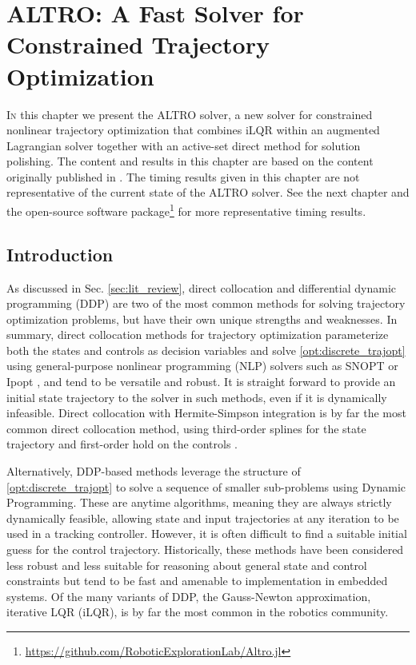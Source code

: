 \documentclass[../root.tex]{subfiles}
\begin{document}
\chapter[ALTRO]{ALTRO: A Fast Solver for Constrained Trajectory Optimization} \label{chap:altro}

\lettrine{I}{n} this chapter we present the ALTRO solver, a new solver for constrained 
nonlinear trajectory optimization that combines iLQR within an augmented 
Lagrangian solver together with an active-set direct method for solution 
polishing. The content and results in this chapter are based on the content
originally published in \cite{howell_ALTRO_2019}. The timing results given 
in this chapter are not representative of the current state of the ALTRO solver.
See the next chapter and the open-source software 
package\footnote{\url{https://github.com/RoboticExplorationLab/Altro.jl}} 
for more representative timing results.

\section{Introduction}

As discussed in Sec. \ref{sec:lit_review}, direct collocation and
differential dynamic programming (DDP) are two of the most common methods for
solving trajectory optimization problems, but have their own unique strengths
and weaknesses. In summary, direct collocation methods for trajectory
optimization parameterize both the states and controls as decision variables
and solve \eqref{opt:discrete_trajopt} using general-purpose nonlinear
programming (NLP) solvers such as SNOPT \cite{gill_SNOPT_2005} or Ipopt
\cite{wachter_Implementation_2006}, and tend to be versatile and robust. It
is straight forward to provide an initial state trajectory to the solver in
such methods, even if it is dynamically infeasible. Direct collocation with
Hermite-Simpson integration is by far the most common direct collocation
method, using third-order splines for the state trajectory and first-order
hold on the controls \cite{hargraves_Direct_1987}.

Alternatively, DDP-based methods leverage the structure of
\eqref{opt:discrete_trajopt} to solve a sequence of smaller sub-problems using
Dynamic Programming. These are anytime algorithms, meaning they are always
strictly dynamically feasible, allowing state and input trajectories at any
iteration to be used in a tracking controller. However, it is often difficult
to find a suitable initial guess for the control trajectory. Historically,
these methods have been considered less robust and less suitable for
reasoning about general state and control constraints but tend to be fast and
amenable to implementation in embedded systems. Of the many variants of DDP,
the Gauss-Newton approximation, iterative LQR (iLQR), is by far the most common
in the robotics community. 
\end{document}
